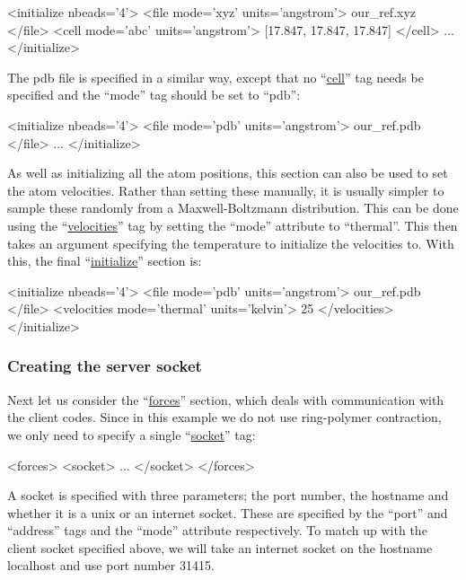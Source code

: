 \documentclass[11pt,english,fleqn]{report}
\newenvironment{code}{%
\footnotesize 
\verbatim
}{
\endverbatim
\normalsize
}
\begin{document}
\begin{code}
<initialize nbeads='4'>
   <file mode='xyz' units='angstrom'> our_ref.xyz </file>
   <cell mode='abc' units='angstrom'>
      [17.847, 17.847, 17.847]
   </cell>
   ...
</initialize>
\end{code}

The pdb file is specified in a similar way, except that no 
{}``\hyperref[INITCELL]{cell}''
tag needs be specified and the {}``mode'' tag should be
set to {}``pdb'':

\begin{code}
<initialize nbeads='4'>
   <file mode='pdb' units='angstrom'> our_ref.pdb </file>
   ...
</initialize>
\end{code}

As well as initializing all the atom positions, this section
can also be used to set the atom velocities. Rather than setting these manually,
it is usually simpler to sample these randomly from a Maxwell-Boltzmann
distribution. This can be done using the 
{}``\hyperref[INITVELOCITIES]{velocities}'' 
tag by setting the {}``mode'' attribute to {}``thermal''.
This then takes an argument specifying the temperature to initialize the
velocities to. With this, the final 
{}``\hyperref[INITIALIZER]{initialize}'' section is:

\begin{code}
<initialize nbeads='4'>
   <file mode='pdb' units='angstrom'> our_ref.pdb </file>
   <velocities mode='thermal' units='kelvin'> 25 </velocities>
</initialize>
\end{code}

\subsubsection{Creating the server socket}

Next let us consider the 
{}``\hyperref[FORCES]{forces}'' section, which deals with communication
with the client codes. Since in this example we do not use ring-polymer contraction,
we only need to specify a single {}``\hyperref[SOCKET]{socket}'' tag:

\begin{code}
<forces>
   <socket>
      ...
   </socket>
</forces>
\end{code}

A socket is specified with three parameters; the port number, the
hostname and whether it is a unix or an internet socket. 
These are specified by the {}``port'' and {}``address'' tags
and the {}``mode'' attribute respectively.
To match up with the client socket specified above,
we will take an internet socket on the hostname localhost and
use port number 31415. 
\end{document}
